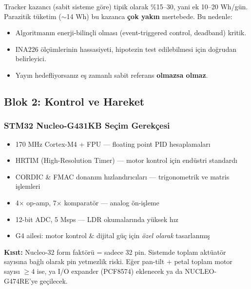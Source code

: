 \documentclass[11pt,a4paper]{article}
\begin{document}
\begin{warnbox}
Tracker kazancı (sabit sisteme göre) tipik olarak \%15--30, yani ek 10--20 Wh/gün. Parazitik tüketim ($\sim$14 Wh) bu kazanca \textbf{çok yakın} mertebede. Bu nedenle:
\begin{itemize}
    \item Algoritmanın enerji-bilinçli olması (event-triggered control, deadband) kritik.
    \item INA226 ölçümlerinin hassasiyeti, hipotezin test edilebilmesi için doğrudan belirleyici.
    \item Yayın hedefliyorsanız eş zamanlı sabit referans \textbf{olmazsa olmaz}.
\end{itemize}
\end{warnbox}

\subsection{Blok 2: Kontrol ve Hareket}

\subsubsection{STM32 Nucleo-G431KB Seçim Gerekçesi}

\begin{infobox}
\begin{itemize}
    \item 170 MHz Cortex-M4 + FPU --- floating point PID hesaplamaları
    \item HRTIM (High-Resolution Timer) --- motor kontrol için endüstri standardı
    \item CORDIC \& FMAC donanım hızlandırıcıları --- trigonometrik ve matris işlemleri
    \item 4$\times$ op-amp, 7$\times$ komparatör --- analog ön-işleme
    \item 12-bit ADC, 5 Msps --- LDR okumalarında yüksek hız
    \item G4 ailesi: motor kontrol \& dijital güç için \textit{özel olarak} tasarlanmış
\end{itemize}
\end{infobox}

\textbf{Kısıt:} Nucleo-32 form faktörü = sadece 32 pin. Sistemde toplam aktüatör sayısına bağlı olarak pin yetmezlik riski. Eğer pan-tilt + petal toplam motor sayısı $\geq 4$ ise, ya I/O expander (PCF8574) eklenecek ya da NUCLEO-G474RE'ye geçilecek.
\end{document}

